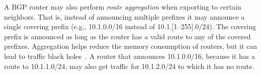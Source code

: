 \documentclass[numbers, 10pt, preprint]{sigplanconf}
\newcommand{\ETC}{\emph{etc.}}
\begin{document}

A BGP router may also perform {\em route aggregation} when exporting to certain neighbors. That is, instead of announcing multiple prefixes it may announce a single covering prefix (e.g., 10.1.0.0/16 instead of 10.1.[1--255].0/24). The covering prefix is announced as long as the router has a valid route to any of the covered prefixes. Aggregation helps reduce the memory consumption of routers, but it can lead to traffic black holes~\cite{route-aggregation}. A router that announces 10.1.0.0/16, because it has a route to 10.1.1.0/24, may also get traffic for 10.1.2.0/24 to which it has no route.

\end{document}
